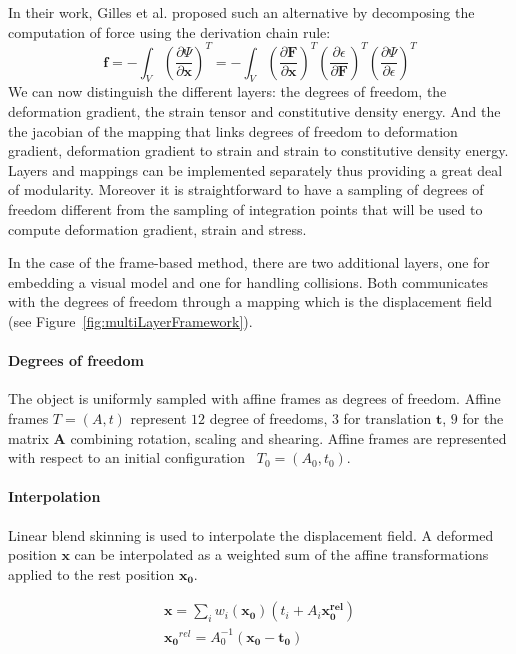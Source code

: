In their work, Gilles et al. \cite{Gilles2011} proposed such an alternative by decomposing the computation of force using the derivation chain rule:
\begin{equation}
\label{eq:forceChainRule}
\mathbf{f} = -\int_{V} \left(\frac{\partial \Psi}{\partial \mathbf{x}}\right)^{T} 
=
-\int_{V} \left(\frac{\partial \mathbf{F}}{\partial \mathbf{x}}\right)^{T}
\left(\frac{\partial \epsilon}{\partial \mathbf{F}}\right)^{T}
\left(\frac{\partial \Psi}{\partial \epsilon}\right)^{T}
\end{equation}
We can now distinguish the different layers: the degrees of freedom, the deformation gradient, the strain tensor and constitutive density energy. And the the jacobian of the mapping that links degrees of freedom to deformation gradient, deformation gradient to strain and strain to constitutive density energy. Layers and mappings can be implemented separately thus providing a great deal of modularity. Moreover it is straightforward to have a sampling of degrees of freedom different from the sampling of integration points that will be used to compute deformation gradient, strain and stress.

In the case of the frame-based method, there are two additional layers, one for embedding a visual model and one for handling collisions. Both communicates with the degrees of freedom through a mapping which is the displacement field (see Figure~\ref{fig:multiLayerFramework}).

\paragraph{Degrees of freedom}
The object is uniformly sampled with affine frames as degrees of freedom. Affine frames $T=(A,t)$ represent $12$ degree of freedoms, $3$ for translation $\mathbf{t}$, $9$ for the matrix $\mathbf{A}$ combining rotation, scaling and shearing. Affine frames are represented with respect to an initial configuration ~$T_{0} = \left(A_{0}, t_{0}\right)$.

\paragraph{Interpolation}
Linear blend skinning is used to interpolate the displacement field. A deformed position $\mathbf{x}$ can be interpolated as a weighted sum of the affine transformations applied to the rest position $\mathbf{x_{0}}$.

\begin{equation}
\begin{array}{l}
\displaystyle \mathbf{x} = \sum_{i} w_{i}(\mathbf{x_{0}})\left(t_{i}+A_{i}\mathbf{x_{0}^{rel}}\right) \\
\displaystyle \mathbf{x_{0}}^{rel} = A_{0}^{-1}\left( \mathbf{x_{0}} - \mathbf{t_{0}} \right)
\end{array}
\end{equation}


